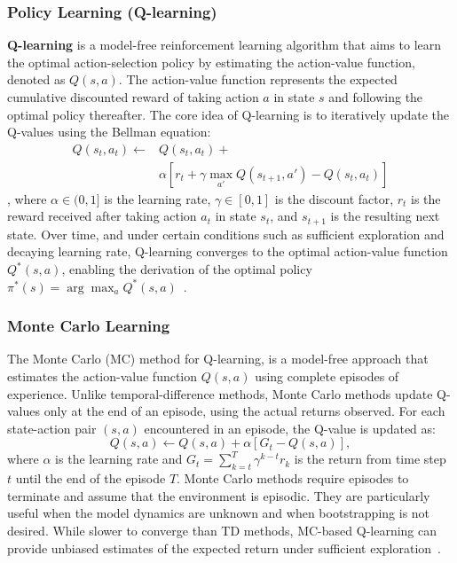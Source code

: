 \subsubsection{Policy Learning (Q-learning)}
\textbf{Q-learning} is a model-free reinforcement learning algorithm that aims to learn the optimal action-selection policy by estimating the action-value function, denoted as $Q(s,a)$. The action-value function represents the expected cumulative discounted reward of taking action $a$ in state $s$ and following the optimal policy thereafter. The core idea of Q-learning is to iteratively update the Q-values using the Bellman equation:
\begin{align*}
   Q(s_t, a_t) \leftarrow& Q(s_t, a_t) + \\
   &\alpha \left[ r_t + \gamma \max_{a'} Q(s_{t+1}, a') - Q(s_t, a_t) \right] 
\end{align*}
,
where $\alpha \in (0,1]$ is the learning rate, $\gamma \in [0,1]$ is the discount factor, $r_t$ is the reward received after taking action $a_t$ in state $s_t$, and $s_{t+1}$ is the resulting next state. Over time, and under certain conditions such as sufficient exploration and decaying learning rate, Q-learning converges to the optimal action-value function $Q^*(s,a)$, enabling the derivation of the optimal policy $\pi^*(s) = \arg\max_a Q^*(s,a)$~\cite{watkins1992qlearning}.

\subsubsection{Monte Carlo Learning}
The Monte Carlo (MC) method for Q-learning, is a model-free approach that estimates the action-value function $Q(s,a)$ using complete episodes of experience. Unlike temporal-difference methods, Monte Carlo methods update Q-values only at the end of an episode, using the actual returns observed. For each state-action pair $(s,a)$ encountered in an episode, the Q-value is updated as:
\[
Q(s,a) \leftarrow Q(s,a) + \alpha \left[ G_t - Q(s,a) \right],
\]
where $\alpha$ is the learning rate and $G_t = \sum_{k=t}^{T} \gamma^{k-t} r_k$ is the return from time step $t$ until the end of the episode $T$. Monte Carlo methods require episodes to terminate and assume that the environment is episodic. They are particularly useful when the model dynamics are unknown and when bootstrapping is not desired. While slower to converge than TD methods, MC-based Q-learning can provide unbiased estimates of the expected return under sufficient exploration~\cite{sutton2018reinforcement}.


